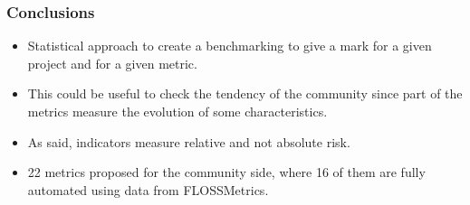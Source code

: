 \documentclass{beamer}
\begin{document}
\begin{frame}
\begin{center}
\begin{tabular}{l*{4}{c}}


\end{tabular}

\end{center}
\end{frame}





\begin{frame}
\frametitle{Conclusions}
\begin{center}
\begin{itemize}
\item Statistical approach to create a benchmarking to give a mark for a given project and for a given metric.
\item This could be useful to check the tendency of the community since part of the metrics measure the evolution of some characteristics.
\item As said, indicators measure relative and not absolute risk. 
\item 22 metrics proposed for the community side, where 16 of them are fully automated using data 
from FLOSSMetrics.
\end{itemize}
\end{center}
\end{frame}
\end{document}
